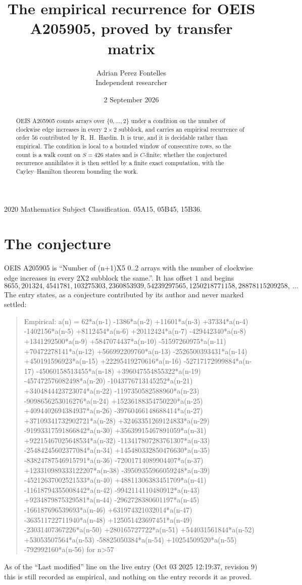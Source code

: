 \documentclass[11pt,a4paper]{article}
\title{The empirical recurrence for OEIS A205905, proved by transfer matrix}
\author{Adrian Perez Fontelles\\ \small Independent researcher}
\date{2 September 2026}
\theoremstyle{plain}
\theoremstyle{definition}
\begin{document}
\maketitle

\begin{abstract}
OEIS A205905 counts arrays over $\{0,\dots,2\}$ under a condition on the number of clockwise edge increases
in every $2\times2$ subblock, and carries an empirical recurrence of order $56$ contributed by
R.~H.~Hardin. It is true, and it is decidable rather than empirical. The condition is local to
a bounded window of consecutive rows, so the count is a walk count on $S=426$ states and is
$C$-finite; whether the conjectured recurrence annihilates it is then settled by a finite exact
computation, with the Cayley--Hamilton theorem bounding the work.
\end{abstract}

\noindent\small 2020 Mathematics Subject Classification. 05A15, 05B45, 15B36.\normalsize

\section{The conjecture}

OEIS A205905 is ``Number of (n+1)X5 0..2 arrays with the number of clockwise edge increases in every 2X2 subblock the same.''. It has offset $1$ and begins
\[
8655, 201324, 4541781, 103275303, 2360853939, 54239297565, 1250218771158, 28878115209258,\ \dots
\]
The entry states, as a conjecture contributed by its author and never marked settled:
\begin{quote}
Empirical: a(n) = 62*a(n-1) -1386*a(n-2) +11601*a(n-3) +37334*a(n-4) -1402156*a(n-5) +8112454*a(n-6) +20112424*a(n-7) -429442340*a(n-8) +1341292500*a(n-9) +5847074437*a(n-10) -51597260975*a(n-11) +70472278141*a(n-12) +566992209760*a(n-13) -2526500393431*a(n-14) +450191596923*a(n-15) +22295419270616*a(n-16) -52717172999884*a(n-17) -45060158513455*a(n-18) +396047554855322*a(n-19) -457472576082498*a(n-20) -1043776713145252*a(n-21) +3404844423723074*a(n-22) -1197350582588960*a(n-23) -9098656253016276*a(n-24) +15236188354750220*a(n-25) +4094402694384937*a(n-26) -39760466148688414*a(n-27) +37109341732902721*a(n-28) +32463351269124833*a(n-29) -91993317591866842*a(n-30) +35639915467891059*a(n-31) +92215467025648534*a(n-32) -113417807283761307*a(n-33) -25484245602377084*a(n-34) +145480332850476630*a(n-35) -83824787546915791*a(n-36) -72001714089904407*a(n-37) +123310989333122207*a(n-38) -39509355966059248*a(n-39) -45212637002521533*a(n-40) +48811306383451709*a(n-41) -11618794355008442*a(n-42) -9942114110480912*a(n-43) +9234879875329581*a(n-44) -2962728380601197*a(n-45) -166187696539693*a(n-46) +631974321032014*a(n-47) -363511722711940*a(n-48) +125051423697451*a(n-49) -23031407367226*a(n-50) +280165727722*a(n-51) +544031561844*a(n-52) +53053507564*a(n-53) -58825050384*a(n-54) +10254509520*a(n-55) -792992160*a(n-56) for n>57
\end{quote}
As of the ``Last modified'' line on the live entry (Oct 03 2025 12:19:37, revision 9) this is still
recorded as empirical, and nothing on the entry records it as proved.
\end{document}
